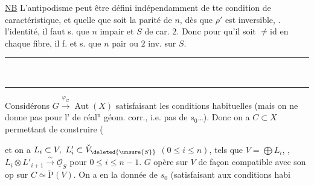 
\uline{NB} L'antipodisme peut être défini  indépendamment de tte condition de caractéristique, et quelle que soit la parité de $n$, dès que $\rho'$ est inversible, .   l'identité, il faut s. que $n$ impair et $S$ de car. $2$. Donc pour qu'il soit $\ne\mathrm{id}$ en chaque fibre, il f. et s. que $n$ pair ou $2$ inv. sur $S$.

\begin{center}\rule{1.1cm}{0.4pt}\\[-.6ex]\rule{.9cm}{0.4pt}\end{center}

Considérons $G\xrightarrow{\varphi_G}\operatorname{Aut}(X)$ satisfaisant les conditions habituelles (mais on ne donne pas pour l' de réal$^{\mathrm n}$ géom. corr., i.e. pas de $s_0$\ldots). Donc on a $C\subset X$ permettant de construire (

et on a $L_i\subset V,\ L'_i\subset\check V_{\deleted{\unsure{S}}}$ $(0\leq i\leq n)$,  tels que $V=\bigoplus L_i$, , $L_i\otimes L'_{i+1}\overset{\sim}{\longrightarrow}\underline{\mathcal O}_S$ pour $0\leq i\leq n-1$.   $G$ opère sur $V$  de façon compatible avec son op sur $C\simeq\check{\mathrm P}(V)$. On a en  la donnée de $s_0$ (satisfaisant aux conditions habi%
